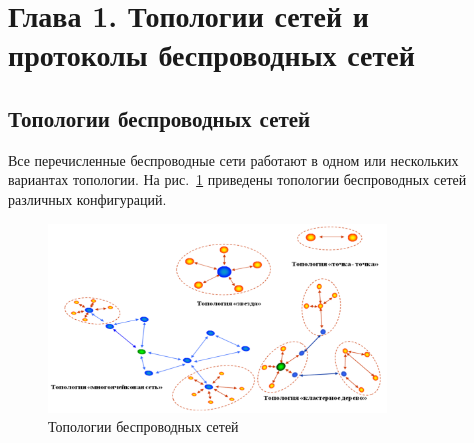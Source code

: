 \documentclass[14pt,a4paper]{extarticle}
\begin{document}

\newpage

\section{Глава 1. Топологии сетей и протоколы беспроводных сетей}

\subsection{Топологии беспроводных сетей}
Все перечисленные беспроводные сети работают в одном или нескольких вариантах
топологии. На рис.~\ref{fig:topologies} приведены топологии беспроводных сетей различных конфигураций.

\begin{figure}[h]
    \centering
    \includegraphics[width=0.8\textwidth]{images/Fig06.png}
    \caption{Топологии беспроводных сетей \cite{wirelessNetProtocols} }
    \label{fig:topologies}
\end{figure}
\end{document}
